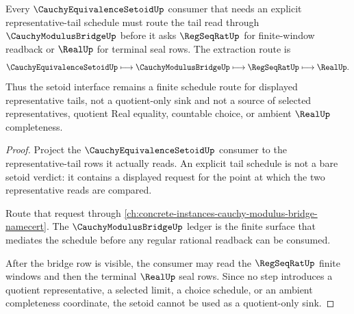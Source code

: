 \begin{theorem}
\label{thm:cauchy-equivalence-setoid-cauchy-modulus-extraction-route}
Every $\CauchyEquivalenceSetoidUp$ consumer that needs an explicit representative-tail schedule must route the tail read through $\CauchyModulusBridgeUp$ before it asks $\RegSeqRatUp$ for finite-window readback or $\RealUp$ for terminal seal rows. The extraction route is
$$
\CauchyEquivalenceSetoidUp \longmapsto \CauchyModulusBridgeUp \longmapsto \RegSeqRatUp \longmapsto \RealUp .
$$
Thus the setoid interface remains a finite schedule route for displayed representative tails, not a quotient-only sink and not a source of selected representatives, quotient Real equality, countable choice, or ambient $\RealUp$ completeness.
\end{theorem}
\begin{proof}
Project the $\CauchyEquivalenceSetoidUp$ consumer to the representative-tail rows it actually reads. An explicit tail schedule is not a bare setoid verdict: it contains a displayed request for the point at which the two representative reads are compared.

Route that request through \autoref{ch:concrete-instances-cauchy-modulus-bridge-namecert}. The $\CauchyModulusBridgeUp$ ledger is the finite surface that mediates the schedule before any regular rational readback can be consumed.

After the bridge row is visible, the consumer may read the $\RegSeqRatUp$ finite windows and then the terminal $\RealUp$ seal rows. Since no step introduces a quotient representative, a selected limit, a choice schedule, or an ambient completeness coordinate, the setoid cannot be used as a quotient-only sink.
\end{proof}
